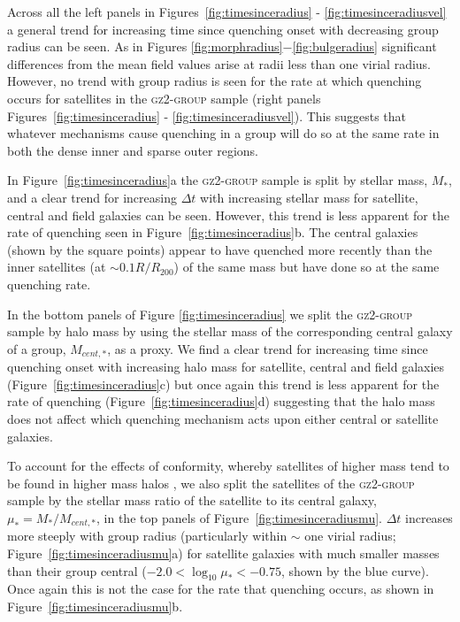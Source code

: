\documentclass[useAMS,usenatbib]{mn2e}
\begin{document}
Across all the left panels in Figures~\ref{fig:timesinceradius} - \ref{fig:timesinceradiusvel} a general trend for increasing time since quenching onset with decreasing group radius can be seen. As in Figures \ref{fig:morphradius}$-$\ref{fig:bulgeradius} significant differences from the mean field values arise at radii less than one virial radius. However, no trend with group radius is seen for the rate at which quenching occurs for satellites in the \textsc{gz2-group} sample (right panels Figures~\ref{fig:timesinceradius} - \ref{fig:timesinceradiusvel}). This suggests that whatever mechanisms cause quenching in a group will do so at the same rate in both the dense inner and sparse outer regions. 

In Figure~\ref{fig:timesinceradius}a the \textsc{gz2-group} sample is split by stellar mass, $M_*$, and a clear trend for increasing $\Delta t$ with increasing stellar mass for satellite, central and field galaxies can be seen. However, this trend is less apparent for the rate of quenching seen in Figure~\ref{fig:timesinceradius}b. The central galaxies (shown by the square points) appear to have quenched more recently than the inner satellites (at $\sim0.1R/R_{200}$) of the same mass but have done so at the same quenching rate. 

In the bottom panels of Figure \ref{fig:timesinceradius} we split the \textsc{gz2-group} sample by halo mass by using the stellar mass of the corresponding central galaxy of a group, $M_{cent,*}$, as a proxy. We find a clear trend for increasing time since quenching onset with increasing halo mass for satellite, central and field galaxies (Figure~\ref{fig:timesinceradius}c) but once again this trend is less apparent for the rate of quenching (Figure~\ref{fig:timesinceradius}d) suggesting that the halo mass does not affect which quenching mechanism acts upon either central or satellite galaxies. 

To account for the effects of conformity, whereby satellites of higher mass tend to be found in higher mass halos \citep{weinmann06, kauffmann13, hearin15, hatfield16}, we also split the satellites of the \textsc{gz2-group} sample by the stellar mass ratio of the satellite to its central galaxy, $\mu_* = M_*/M_{cent,*}$, in the top panels of Figure~\ref{fig:timesinceradiusmu}. $\Delta t $ increases more steeply with group radius (particularly within $\sim$ one virial radius; Figure~\ref{fig:timesinceradiusmu}a) for satellite galaxies with much smaller masses than their group central ($-2.0 < \log_{10}\mu_* < -0.75$, shown by the blue curve). Once again this is not the case for the rate that quenching occurs, as shown in Figure~\ref{fig:timesinceradiusmu}b. 
\end{document}
